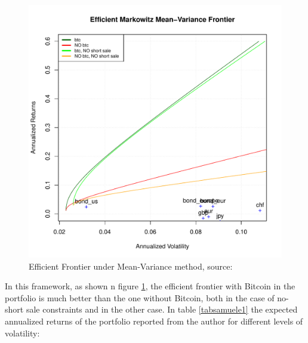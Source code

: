 \begin{figure}[H]
		\centering
		\includegraphics[width=13cm]{Images/images_samuele/efficient_frontier.pdf} %
        \caption{Efficient Frontier under Mean-Variance method, source: \citep{samuele}}
        \label{samuele3}
\end{figure}

In this framework, as shown n figure \ref{samuele3}, the efficient frontier with Bitcoin in the portfolio is much better than the one without Bitcoin, both in the case of no-short sale constraints and in the other case.
\newpage
In table \ref{tabsamuele1} the expected annualized returns of the portfolio reported from the author for different levels of volatility:

